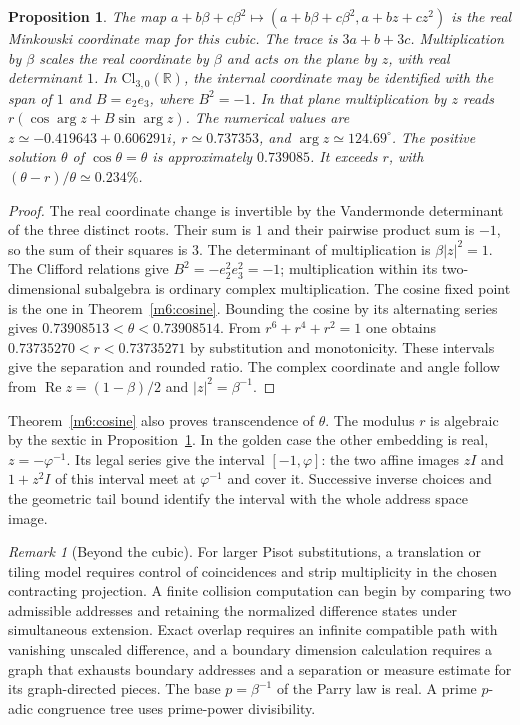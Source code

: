 \documentclass[11pt,reqno]{amsart}
\newtheorem{proposition}[theorem]{Proposition}
\theoremstyle{definition}
\theoremstyle{remark}
\newtheorem{remark}[theorem]{Remark}
\numberwithin{equation}{section}
\newcommand{\R}{\mathbb{R}}
\newcommand{\re}{\operatorname{Re}}
\begin{document}
\begin{proposition}\label{m9:scales}
The map \(a+b\beta+c\beta^2\mapsto(a+b\beta+c\beta^2,a+bz+cz^2)\)
is the real Minkowski coordinate map for this cubic. The trace
is \(3a+b+3c\). Multiplication by \(\beta\) scales the real
coordinate by \(\beta\) and acts on the plane by \(z\), with
real determinant \(1\). In \(\mathrm{Cl}_{3,0}(\R)\), the
internal coordinate may be identified with the span of \(1\)
and \(B=e_2e_3\), where \(B^2=-1\). In that plane multiplication
by \(z\) reads \(r(\cos\arg z+B\sin\arg z)\).
The numerical values are \(z\simeq-0.419643+0.606291i\),
\(r\simeq0.737353\), and \(\arg z\simeq124.69^\circ\).
The positive solution \(\theta\) of \(\cos\theta=\theta\) is
approximately \(0.739085\). It exceeds \(r\), with
\((\theta-r)/\theta\simeq0.234\%\).
\end{proposition}
\begin{proof}
The real coordinate change is invertible by the Vandermonde
determinant of the three distinct roots. Their sum is \(1\)
and their pairwise product sum is \(-1\), so the sum of
their squares is \(3\). The determinant of multiplication is
\(\beta |z|^2=1\). The Clifford relations give
\(B^2=-e_2^2e_3^2=-1\); multiplication within its two-dimensional
subalgebra is ordinary complex multiplication.
The cosine fixed point is the one in Theorem~\ref{m6:cosine}.
Bounding the cosine by its alternating series gives \(0.73908513<\theta<0.73908514\).
From \(r^6+r^4+r^2=1\) one obtains
\(0.73735270<r<0.73735271\) by substitution and monotonicity.
These intervals give the separation and rounded ratio. The complex
coordinate and angle follow from \(\re z=(1-\beta)/2\) and
\(|z|^2=\beta^{-1}\).
\end{proof}

Theorem~\ref{m6:cosine} also proves transcendence of \(\theta\).
The modulus \(r\) is algebraic by the sextic in
Proposition~\ref{m9:scales}. In the golden case the other
embedding is real, \(z=-\varphi^{-1}\). Its legal series give the
interval \([-1,\varphi]\): the two affine images \(zI\) and
\(1+z^2 I\) of this interval meet at \(\varphi^{-1}\) and cover it.
Successive inverse choices and the geometric tail bound identify
the interval with the whole address space image.

\begin{remark}[Beyond the cubic]\label{m9:pisot-programme}
For larger Pisot substitutions, a translation or tiling model
requires control of coincidences and strip multiplicity in the
chosen contracting projection. A finite collision computation can
begin by comparing two admissible addresses and retaining the
normalized difference states under simultaneous extension. Exact
overlap requires an infinite compatible path with vanishing
unscaled difference, and a boundary dimension calculation
requires a graph that exhausts boundary addresses and a separation
or measure estimate for its graph-directed pieces. The base
\(p=\beta^{-1}\) of the Parry law is real. A prime \(p\)-adic
congruence tree uses prime-power divisibility.
\end{remark}
\end{document}
